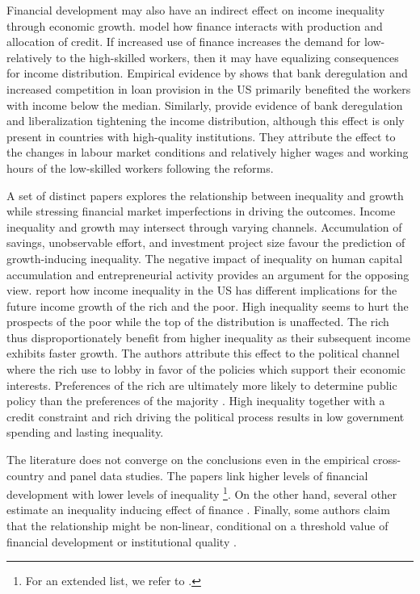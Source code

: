 \documentclass[preprint, nonatbib, 10pt]{elsarticle}
\begin{document}
Financial development may also have an indirect effect on income inequality through economic growth. \textcite{townsendeueda2006} model how finance interacts with production and allocation of credit. If increased use of finance increases the demand for low- relatively to the high-skilled workers, then it may have equalizing consequences for income distribution. Empirical evidence by \textcite{beck2010big} shows that bank deregulation and increased competition in loan provision in the US primarily benefited the workers with income below the median. Similarly, \textcite{delis2014} provide evidence of bank deregulation and liberalization tightening the income distribution, although this effect is only present in countries with high-quality institutions. They attribute the effect to the changes in labour market conditions and relatively higher wages and working hours of the low-skilled workers following the reforms. 

A set of distinct papers explores the relationship between inequality and growth while stressing financial market imperfections in driving the outcomes. Income inequality and growth may intersect through varying channels. Accumulation of savings, unobservable effort, and investment project size favour the prediction of growth-inducing inequality. The negative impact of inequality on human capital accumulation and entrepreneurial activity provides an argument for the opposing view. 
\textcite{milanovicvan2018inequality} report how income inequality in the US has different implications for the future income growth of the rich and the poor. High inequality seems to hurt the prospects of the poor while the top of the distribution is unaffected. The rich thus disproportionately benefit from higher inequality as their subsequent income exhibits faster growth. The authors attribute this effect to the political channel where the rich use to lobby in favor of the policies which support their economic interests. Preferences of the rich are ultimately more likely to determine public policy than the preferences of the majority \parencite{gilens_page_2014}. High inequality together with a credit constraint and rich driving the political process results in low government spending and lasting inequality.

The literature does not converge on the conclusions even in the empirical cross-country and panel data studies. The papers link higher levels of financial development with lower levels of inequality \parencite{beck2007finance, hamori2012, gimet2011closer, kunieda2014finance}\footnote{For an extended list, we refer to \textcite{de2017finance}.}. On the other hand, several other estimate an inequality inducing effect of finance \parencite{Jaumotte2013, jauch2016financial, de2017finance}. Finally, some authors claim that the relationship might be non-linear, conditional on a threshold value of financial development \parencite{kim2011nonlinearity,tan2012nonlinear} or institutional quality \parencite{LawSingh2014, delis2014}.
\end{document}
